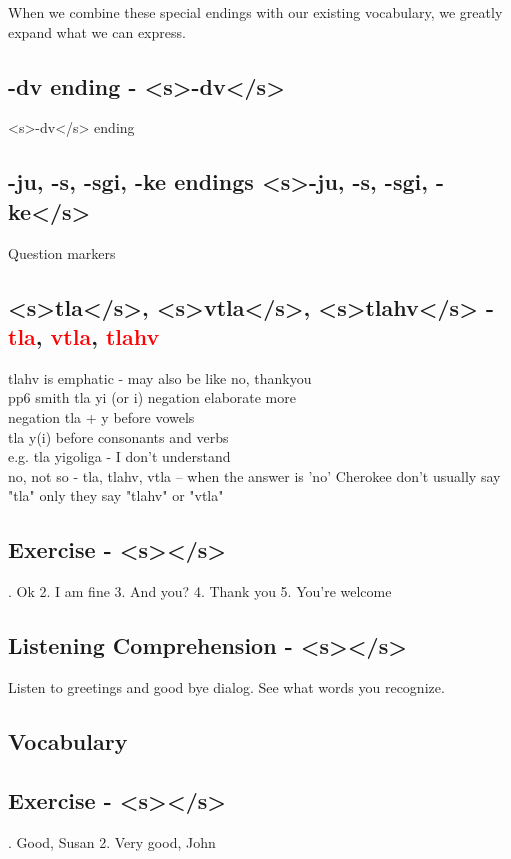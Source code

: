 %
When we combine these special endings with our existing vocabulary, we greatly expand what we can express.
\cite{joyner21}

\subsection{-dv ending - <s>-dv</s>}
<s>-dv</s> ending

\subsection{-ju, -s, -sgi, -ke endings <s>-ju, -s, -sgi, -ke</s>}
Question markers

\subsection{<s>tla</s>, <s>vtla</s>, <s>tlahv</s> - \textcolor{red}{tla}, \textcolor{red}{vtla}, \textcolor{red}{tlahv}}
tlahv is emphatic - may also be like no, thankyou\\
pp6 smith tla yi (or i) negation elaborate more\\
negation tla + y before vowels\\
tla y(i) before consonants and verbs\\
e.g. tla yigoliga - I don't understand \cite{SmithHolmespp32}
\\
no, not so - tla, tlahv, vtla -- when the answer is 'no' Cherokee don't usually say "tla" only they say "tlahv" or "vtla"
\cite{SmithHolmespp6}

\subsection{Exercise - <s></s>}
. Ok 2. I am fine 3. And you? 4. Thank you 5. You're welcome

\subsection{Listening Comprehension - <s></s>}
\noindent Listen to greetings and good bye dialog. See what words you recognize.

\subsection{Vocabulary}


\subsection{Exercise - <s></s>}
. Good, Susan 2. Very good, John\\

